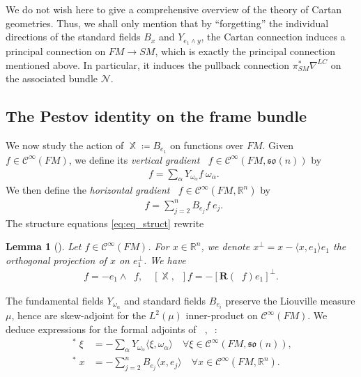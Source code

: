 \documentclass[12pt]{amsart}
\numberwithin{numbering}{section}
\theoremstyle{plain}
\newtheorem{lem}[numbering]{Lemma}
\theoremstyle{definition}
\theoremstyle{remark}
\numberwithin{equation}{section}
\DeclareMathOperator{\nv}{\nabla_{\mathbb{V}}}
\DeclareMathOperator{\nh}{\nabla_{\mathbb{H}}}
\DeclareMathOperator{\xx}{\mathbb{X}}
\newcommand{\psm}{\pi_{SM}}
\newcommand{\rfm}{\mathbf{R}}
\newcommand{\R}{\mathbb{R}}
\newcommand{\frk}[1]{\mathfrak{#1}}
\begin{document}
We do not wish here to give a comprehensive overview of the theory of Cartan geometries. Thus, we shall only mention that by “forgetting” the individual directions of the standard fields $B_x$ and $Y_{e_1 \wedge y}$, the Cartan connection induces a principal connection on $FM \to SM$, which is exactly the principal connection mentioned above. In particular, it induces the pullback connection $\psm^* \nabla^{LC}$ on the associated bundle $\mathcal{N}$.


\subsection{The Pestov identity on the frame bundle} \label{sec:levi_civita_pestov}

We now study the action of $\xx \coloneq B_{e_1}$ on functions over $FM$. Given $f \in \mathcal{C}^\infty(FM)$, we define its \emph{vertical gradient} $\nv f \in \mathcal{C}^\infty(FM, \frk{so}(n))$ by 
\begin{align}
\nv f = \sum_\alpha Y_{\omega_\alpha} f \ \omega_\alpha.
\end{align}
We then define the \emph{horizontal gradient} $\nh f \in \mathcal{C}^\infty(FM, \R^n)$ by 
\begin{align}
\nh f = \sum_{j=2}^n B_{e_j} f \ e_j.
\end{align}
The structure equations \eqref{eq:eq_struct} rewrite 
\begin{lem}[{\cite[Lemma 2.1]{cekic2025pestov}}]
Let $f \in \mathcal{C}^\infty(FM)$. For $x \in \R^n$, we denote $x^\perp = x - \langle x, e_1 \rangle e_1$ the orthogonal projection of $x$ on $e_1^\perp$. We have
\begin{align}
[\xx, \nv] f = - e_1 \wedge \nh f, \quad [\xx, \nh] f = - [\rfm(\nv f) e_1]^\perp.
\end{align}
\end{lem}


The fundamental fields $Y_{\omega_\alpha}$ and standard fields $B_{e_i}$ preserve the Liouville measure $\mu$, hence are skew-adjoint for the $L^2(\mu)$ inner-product on $\mathcal{C}^\infty(FM)$. We deduce expressions for the formal adjoints of $\nv, \nh$: 
\begin{align}
\nv^* \xi &= - \sum_\alpha Y_{\omega_\alpha} \langle \xi, \omega_\alpha \rangle \quad \forall \xi \in \mathcal{C}^\infty(FM, \frk{so}(n)), \\ 
\nh^* x &= - \sum_{j=2}^n B_{e_j} \langle x, e_j \rangle \quad \forall x \in \mathcal{C}^\infty(FM, \R^n).
\end{align}
\end{document}
